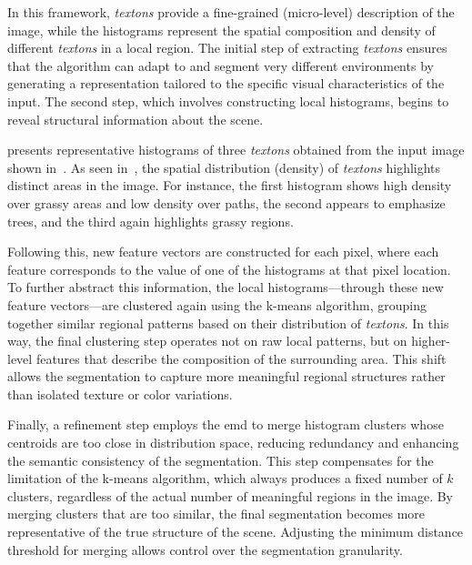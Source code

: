 In this framework, \textit{textons} provide a fine-grained (micro-level) description of the image, while the histograms
represent the spatial composition and density of different \textit{textons} in a local region.
The initial step of extracting \textit{textons} ensures that the algorithm can adapt to and segment very different
environments by generating a representation tailored to the specific visual characteristics of the input.
The second step, which involves constructing local histograms, begins to reveal structural information about the scene.

 presents representative histograms of three \textit{textons} obtained from
the input image shown in~.
As seen in~, the spatial distribution (density) of \textit{textons} highlights distinct areas in the image.
For instance, the first histogram shows high density over grassy areas and low density over paths, the second appears to
emphasize trees, and the third again highlights grassy regions.

Following this, new feature vectors are constructed for each pixel, where each feature corresponds to the value of one
of the histograms at that pixel location.
To further abstract this information, the local histograms---through these new feature vectors---are clustered again using the
k-means algorithm, grouping together similar regional patterns based on their distribution of \textit{textons}.
In this way, the final clustering step operates not on raw local patterns, but on higher-level features that
describe the composition of the surrounding area.
This shift allows the segmentation to capture more meaningful regional structures rather than isolated texture or color variations.

Finally, a refinement step employs the \gls{emd} to merge histogram clusters whose centroids are too close in distribution
space, reducing redundancy and enhancing the semantic consistency of the segmentation.
This step compensates for the limitation of the k-means algorithm, which always produces a fixed number of $k$ clusters,
regardless of the actual number of meaningful regions in the image.
By merging clusters that are too similar, the final segmentation becomes more representative of the true structure of the scene.
Adjusting the minimum distance threshold for merging allows control over the segmentation granularity.



